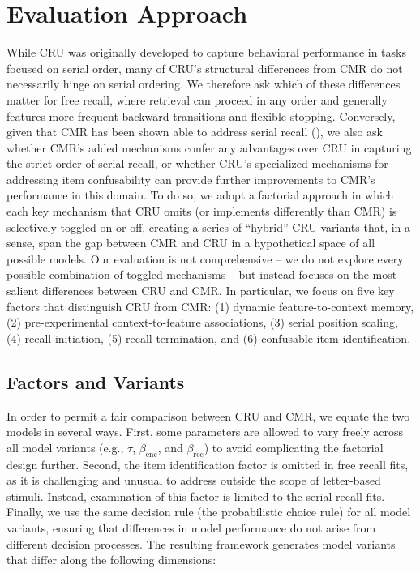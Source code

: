 \documentclass[
  man,
  floatsintext,
  longtable,
  nolmodern,
  notxfonts,
  notimes,
  draftfirst,
  colorlinks=true,linkcolor=blue,citecolor=blue,urlcolor=blue]{apa7}
\begin{document}
\section{Evaluation Approach}\label{evaluation-approach}

While CRU was originally developed to capture behavioral performance in
tasks focused on serial order, many of CRU's structural differences from
CMR do not necessarily hinge on serial ordering. We therefore ask which
of these differences matter for free recall, where retrieval can proceed
in any order and generally features more frequent backward transitions
and flexible stopping. Conversely, given that CMR has been shown able to
address serial recall (), we also ask whether CMR's added mechanisms confer any advantages
over CRU in capturing the strict order of serial recall, or whether
CRU's specialized mechanisms for addressing item confusability can
provide further improvements to CMR's performance in this domain. To do
so, we adopt a factorial approach in which each key mechanism that CRU
omits (or implements differently than CMR) is selectively toggled on or
off, creating a series of ``hybrid'' CRU variants that, in a sense, span
the gap between CMR and CRU in a hypothetical space of all possible
models. Our evaluation is not comprehensive -- we do not explore every
possible combination of toggled mechanisms -- but instead focuses on the
most salient differences between CRU and CMR. In particular, we focus on
five key factors that distinguish CRU from CMR: (1) dynamic
feature-to-context memory, (2) pre-experimental context-to-feature
associations, (3) serial position scaling, (4) recall initiation, (5)
recall termination, and (6) confusable item identification.

\subsection{Factors and Variants}\label{factors-and-variants}

In order to permit a fair comparison between CRU and CMR, we equate the
two models in several ways. First, some parameters are allowed to vary
freely across all model variants (e.g., \(\tau\), \(\beta_\text{enc}\),
and \(\beta_\text{rec}\)) to avoid complicating the factorial design
further. Second, the item identification factor is omitted in free
recall fits, as it is challenging and unusual to address outside the
scope of letter-based stimuli. Instead, examination of this factor is
limited to the serial recall fits. Finally, we use the same decision
rule (the probabilistic choice rule) for all model variants, ensuring
that differences in model performance do not arise from different
decision processes. The resulting framework generates model variants
that differ along the following dimensions:
\end{document}
